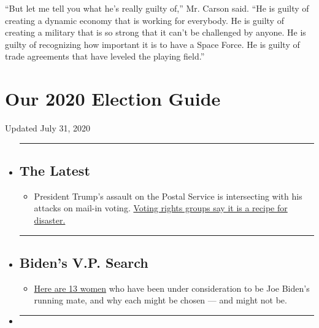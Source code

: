 ``But let me tell you what he's really guilty of,'' Mr. Carson said.
``He is guilty of creating a dynamic economy that is working for
everybody. He is guilty of creating a military that is so strong that it
can't be challenged by anyone. He is guilty of recognizing how important
it is to have a Space Force. He is guilty of trade agreements that have
leveled the playing field.''

\hypertarget{our-2020-election-guide}{%
\section{Our 2020 Election Guide}\label{our-2020-election-guide}}

Updated July 31, 2020

\begin{itemize}
\item
  \begin{center}\rule{0.5\linewidth}{\linethickness}\end{center}

  \hypertarget{the-latest}{%
  \subsection{The Latest}\label{the-latest}}

  \begin{itemize}
  \tightlist
  \item
    President Trump's assault on the Postal Service is intersecting with
    his attacks on mail-in voting.
    \href{https://www.nytimes.com/2020/07/31/us/politics/trump-usps-mail-delays.html?action=click\&pgtype=Article\&state=default\&region=BELOW_MAIN_CONTENT\&context=storylines_guide}{Voting
    rights groups say it is a recipe for disaster.}
  \end{itemize}
\item
  \begin{center}\rule{0.5\linewidth}{\linethickness}\end{center}

  \hypertarget{bidens-vp-search}{%
  \subsection{Biden's V.P. Search}\label{bidens-vp-search}}

  \begin{itemize}
  \tightlist
  \item
    \href{https://www.nytimes.com/article/biden-vice-president-2020.html?action=click\&pgtype=Article\&state=default\&region=BELOW_MAIN_CONTENT\&context=storylines_guide}{Here
    are 13 women} who have been under consideration to be Joe Biden's
    running mate, and why each might be chosen --- and might not be.
  \end{itemize}
\item
  \begin{center}\rule{0.5\linewidth}{\linethickness}\end{center}


\end{itemize}
